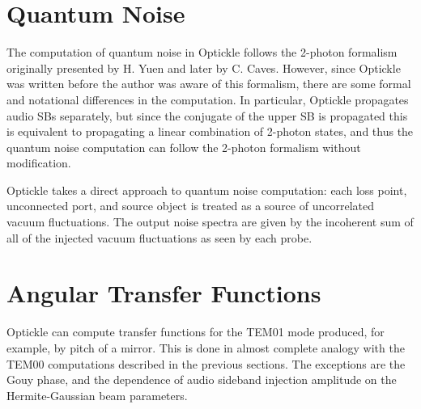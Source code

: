 \documentclass[12pt]{article}
\begin{document}
\section{Quantum Noise}

The computation of quantum noise in Optickle follows the 2-photon formalism
 originally presented by H. Yuen and later by C. Caves.
However, since Optickle was written before the author was aware of this formalism,
 there are some formal and notational differences in the computation.
In particular, Optickle propagates audio SBs separately, but since the conjugate of the upper SB
 is propagated this is equivalent to propagating a linear combination of 2-photon states,
 and thus the quantum noise computation can follow the 2-photon formalism without modification.

Optickle takes a direct approach to quantum noise computation:
 each loss point, unconnected port, and source object is treated as a source of
 uncorrelated vacuum fluctuations.
The output noise spectra are given by the incoherent sum of all of the injected vacuum
 fluctuations as seen by each probe.

\section{Angular Transfer Functions}

Optickle can compute transfer functions for the TEM01 mode produced, for example, by pitch of a mirror.
This is done in almost complete analogy with the TEM00 computations described in the previous sections.
The exceptions are the Gouy phase, and the dependence of audio sideband injection amplitude on the Hermite-Gaussian beam parameters.

\end{document}
